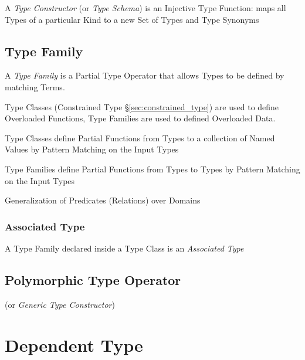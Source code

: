 A \emph{Type Constructor} (or \emph{Type Schema}) is an Injective Type
Function: maps all Types of a particular Kind to a new Set of Types
and Type Synonyms



\subsection{Type Family}\label{sec:type_family}

A \emph{Type Family} is a Partial Type Operator that allows Types to
be defined by matching Terms.


Type Classes (Constrained Type \S\ref{sec:constrained_type}) are used
to define Overloaded Functions, Type Families are used to defined
Overloaded Data.

Type Classes define Partial Functions from Types to a collection of
Named Values by Pattern Matching on the Input Types

Type Families define Partial Functions from Types to Types by Pattern
Matching on the Input Types

Generalization of Predicates (Relations) over Domains



\subsubsection{Associated Type}\label{sec:associated_type}

A Type Family declared inside a Type Class is an \emph{Associated
  Type}



\subsection{Polymorphic Type Operator}
\label{sec:polymorphic_type_operator}

(or \emph{Generic Type Constructor})



\section{Dependent Type}\label{sec:dependent_type}

